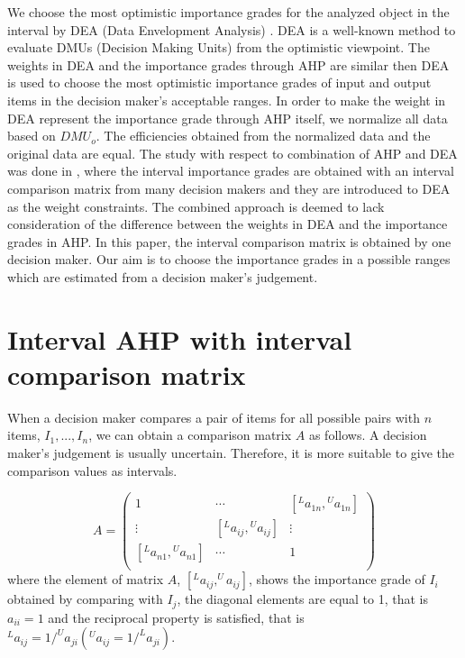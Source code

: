 We choose the most optimistic importance grades for the analyzed object in the interval by DEA (Data  Envelopment  Analysis) \cite{Charnes}\cite{Kaoru Tone}. 
DEA is a well-known method to evaluate DMUs (Decision  Making  Units) from the optimistic viewpoint. 
The weights in DEA and the importance grades through AHP are similar then DEA is used to choose the most optimistic importance grades of input and output items in the decision maker's acceptable ranges. 
In order to make the weight in DEA represent the importance grade through AHP itself, we normalize all data based on $DMU_o$. 
The efficiencies obtained from the normalized data and the original data are equal. 
The study with respect to combination of AHP and DEA was done in \cite{Ozawa}, 
where the interval importance grades are obtained with an interval comparison matrix from many decision makers and they are introduced to DEA as the weight constraints. 
The combined approach is deemed to lack consideration of the difference between the weights in DEA and the importance grades in AHP. 
In this paper, the interval comparison matrix is obtained by one decision maker. 
Our aim is to choose the importance grades in a possible ranges which are estimated from a decision maker's judgement. 

\section{Interval AHP with interval comparison matrix}

When a decision maker compares a pair of items for all possible pairs with $n$ items, $I_1,...,I_n$, we can obtain a comparison matrix $A$ as follows. 
A decision maker's judgement is usually uncertain. 
Therefore, it is more suitable to give the comparison values as intervals.

\[
A=\left(
\begin{array}{ccc}
1 &  \cdots & \left[{^L{a}_{1n}},{^U{a}_{1n}}\right] \\
\vdots  & \left[{^L{a}_{ij}},{^U{a}_{ij}}\right] & \vdots \\
\left[{^L{a}_{n1}},{^U{a}_{n1}}\right]  & \cdots & 1 \\
\end{array}
\right)
\]
where the element of matrix $A$, $[^{L}a_{ij},^{U}a_{ij}]$, shows the importance grade of $I_i$ obtained by comparing with $I_j$, the diagonal elements are equal to 1, that is $a_{ii}=1$ and the reciprocal property is satisfied, that is $^{L}a_{ij}=1/^{U}a_{ji}(^{U}a_{ij}=1/^{L}a_{ji})$. 

